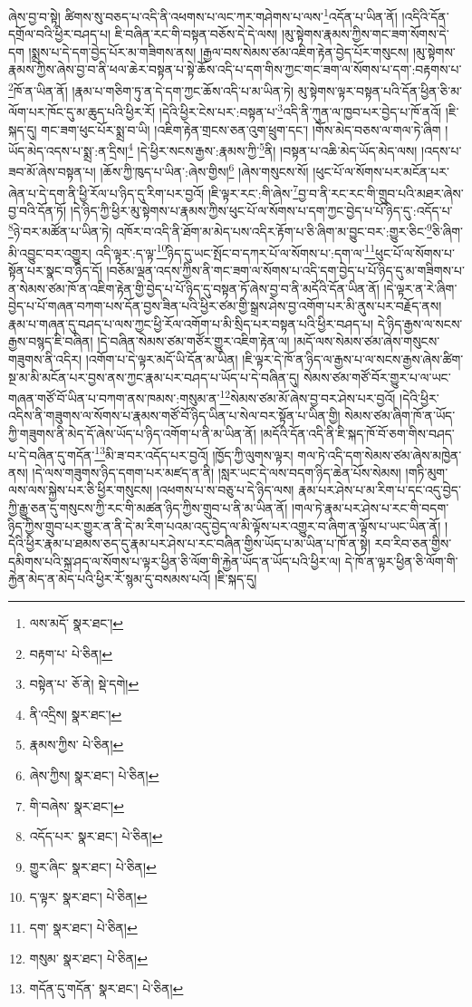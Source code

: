 ཞེས་བྱ་བ་སྟེ། ཚིགས་སུ་བཅད་པ་འདི་ནི་འཕགས་པ་ལང་ཀར་གཤེགས་པ་ལས་\footnote{ལས་མདོ་  སྣར་ཐང་། }འདོན་པ་ཡིན་ནོ། །འདིའི་དོན་དགྲོལ་བའི་ཕྱིར་བཤད་པ། ཇི་བཞིན་རང་གི་བསྟན་བཅོས་དེ་དེ་ལས། །མུ་སྟེགས་རྣམས་ཀྱིས་གང་ཟག་སོགས་དེ་དག །སྨྲས་པ་དེ་དག་བྱེད་པོར་མ་གཟིགས་ནས། །རྒྱལ་བས་སེམས་ཙམ་འཇིག་རྟེན་བྱེད་པོར་གསུངས། །མུ་སྟེགས་རྣམས་ཀྱིས་ཞེས་བྱ་བ་ནི་ཕལ་ཆེར་བསྟན་པ་སྟེ་ཆོས་འདི་པ་དག་གིས་ཀྱང་གང་ཟག་ལ་སོགས་པ་དག་:བརྟགས་པ་\footnote{བརྟག་པ་  པེ་ཅིན། }ཁོ་ན་ཡིན་ནོ། །རྣམ་པ་གཅིག་ཏུ་ན་དེ་དག་ཀྱང་ཆོས་འདི་པ་མ་ཡིན་ཏེ། མུ་སྟེགས་ལྟར་བསྟན་པའི་དོན་ཕྱིན་ཅི་མ་ལོག་པར་ཁོང་དུ་མ་ཆུད་པའི་ཕྱིར་རོ། །དེའི་ཕྱིར་ངེས་པར་:བསྟན་པ་\footnote{བསྟེན་པ་  ཅོ་ནེ།  སྡེ་དགེ། }འདི་ནི་ཀུན་ལ་ཁྱབ་པར་བྱེད་པ་ཁོ་ནའོ། །ཇི་སྐད་དུ། གང་ཟག་ཕུང་པོར་སྨྲ་བ་ཡི། །འཇིག་རྟེན་གྲངས་ཅན་འུག་ཕྲུག་དང་། །གོས་མེད་བཅས་ལ་གལ་ཏེ་ཞིག །ཡོད་མེད་འདས་པ་སྨྲ་:ན་དྲིས།\footnote{ནི་འདྲིས།  སྣར་ཐང་། } །དེ་ཕྱིར་སངས་རྒྱས་:རྣམས་ཀྱི་\footnote{རྣམས་ཀྱིས་  པེ་ཅིན། }ནི། །བསྟན་པ་འཆི་མེད་ཡོད་མེད་ལས། །འདས་པ་ཟབ་མོ་ཞེས་བསྟན་པ། །ཆོས་ཀྱི་ཁུད་པ་ཡིན་:ཞེས་གྱིས།\footnote{ཞེས་ཀྱིས།  སྣར་ཐང་།  པེ་ཅིན། } །ཞེས་གསུངས་སོ། །ཕུང་པོ་ལ་སོགས་པར་མངོན་པར་ཞེན་པ་དེ་དག་ནི་ཕྱི་རོལ་པ་ཉིད་དུ་རིག་པར་བྱའོ། །ཇི་ལྟར་རང་:གི་ཞེས་\footnote{གི་བཞེས་  སྣར་ཐང་། }བྱ་བ་ནི་རང་རང་གི་གྲུབ་པའི་མཐར་ཞེས་བྱ་བའི་དོན་ཏོ། །དེ་ཉིད་ཀྱི་ཕྱིར་མུ་སྟེགས་པ་རྣམས་ཀྱིས་ཕུང་པོ་ལ་སོགས་པ་དག་ཀྱང་བྱེད་པ་པོ་ཉིད་དུ་:འདོད་པ་\footnote{འདོད་པར་  སྣར་ཐང་།  པེ་ཅིན། }ཉེ་བར་མཚོན་པ་ཡིན་ཏེ། འཁོར་བ་འདི་ནི་ཐོག་མ་མེད་པས་འདིར་རྟོག་པ་ཅི་ཞིག་མ་བྱུང་བར་:གྱུར་ཅིང་\footnote{གྱུར་ཞིང་  སྣར་ཐང་།  པེ་ཅིན། }ཅི་ཞིག་མི་འབྱུང་བར་འགྱུར། འདི་ལྟར་:ད་ལྟ་\footnote{ད་ལྟར་  སྣར་ཐང་།  པེ་ཅིན། }ཉིད་དུ་ཡང་སྤོང་བ་དཀར་པོ་ལ་སོགས་པ་:དག་ལ་\footnote{དག་  སྣར་ཐང་།  པེ་ཅིན། }ཕུང་པོ་ལ་སོགས་པ་སྟོན་པར་སྣང་བ་ཉིད་དོ། །བཅོམ་ལྡན་འདས་ཀྱིས་ནི་གང་ཟག་ལ་སོགས་པ་འདི་དག་བྱེད་པ་པོ་ཉིད་དུ་མ་གཟིགས་པ་ན་སེམས་ཙམ་ཁོ་ན་འཇིག་རྟེན་གྱི་བྱེད་པ་པོ་ཉིད་དུ་བསྟན་ཏོ་ཞེས་བྱ་བ་ནི་མདོའི་དོན་ཡིན་ནོ། །དེ་ལྟར་ན་རེ་ཞིག་བྱེད་པ་པོ་གཞན་བཀག་པས་དོན་བྱས་ཟིན་པའི་ཕྱིར་ཙམ་གྱི་སྒྲས་ཤེས་བྱ་འགོག་པར་མི་ནུས་པར་བརྗོད་ནས། རྣམ་པ་གཞན་དུ་བཤད་པ་ལས་ཀྱང་ཕྱི་རོལ་འགོག་པ་མི་སྲིད་པར་བསྟན་པའི་ཕྱིར་བཤད་པ། དེ་ཉིད་རྒྱས་ལ་སངས་རྒྱས་བསྙད་ཇི་བཞིན། །དེ་བཞིན་སེམས་ཙམ་གཙོར་གྱུར་འཇིག་རྟེན་ལ། །མདོ་ལས་སེམས་ཙམ་ཞེས་གསུངས་གཟུགས་ནི་འདིར། །འགོག་པ་དེ་ལྟར་མདོ་ཡི་དོན་མ་ཡིན། །ཇི་ལྟར་དེ་ཁོ་ན་ཉིད་ལ་རྒྱས་པ་ལ་སངས་རྒྱས་ཞེས་ཚིག་སྔ་མ་མི་མངོན་པར་བྱས་ནས་ཀྱང་རྣམ་པར་བཤད་པ་ཡོད་པ་དེ་བཞིན་དུ། སེམས་ཙམ་གཙོ་བོར་གྱུར་པ་ལ་ཡང་གཞན་གཙོ་བོ་ཡིན་པ་བཀག་ནས་ཁམས་:གསུམ་ན་\footnote{གསུམ་  སྣར་ཐང་།  པེ་ཅིན། }སེམས་ཙམ་མོ་ཞེས་བྱ་བར་ཤེས་པར་བྱའོ། །དེའི་ཕྱིར་འདིས་ནི་གཟུགས་ལ་སོགས་པ་རྣམས་གཙོ་བོ་ཉིད་ཡིན་པ་སེལ་བར་སྟོན་པ་ཡིན་གྱི། སེམས་ཙམ་ཞིག་ཁོ་ན་ཡོད་ཀྱི་གཟུགས་ནི་མེད་དོ་ཞེས་ཡོད་པ་ཉིད་འགོག་པ་ནི་མ་ཡིན་ནོ། །མདོའི་དོན་འདི་ནི་ཇི་སྐད་ཁོ་བོ་ཅག་གིས་བཤད་པ་དེ་བཞིན་དུ་གདོན་\footnote{གདོན་དུ་གདོན་  སྣར་ཐང་།  པེ་ཅིན། }མི་ཟ་བར་འདོད་པར་བྱའོ། །ཁྱོད་ཀྱི་ལུགས་ལྟར། གལ་ཏེ་འདི་དག་སེམས་ཙམ་ཞེས་མཁྱེན་ནས། །དེ་ལས་གཟུགས་ཉིད་དགག་པར་མཛད་ན་ནི། །སླར་ཡང་དེ་ལས་བདག་ཉིད་ཆེན་པོས་སེམས། །གཏི་མུག་ལས་ལས་སྐྱེས་པར་ཅི་ཕྱིར་གསུངས། །འཕགས་པ་ས་བཅུ་པ་དེ་ཉིད་ལས། རྣམ་པར་ཤེས་པ་མ་རིག་པ་དང་འདུ་བྱེད་ཀྱི་རྒྱུ་ཅན་དུ་གསུངས་ཀྱི་རང་གི་མཚན་ཉིད་ཀྱིས་གྲུབ་པ་ནི་མ་ཡིན་ནོ། །གལ་ཏེ་རྣམ་པར་ཤེས་པ་རང་གི་བདག་ཉིད་ཀྱིས་གྲུབ་པར་གྱུར་ན་ནི་དེ་མ་རིག་པའམ་འདུ་བྱེད་ལ་མི་ལྟོས་པར་འགྱུར་བ་ཞིག་ན་ལྟོས་པ་ཡང་ཡིན་ནོ། །དེའི་ཕྱིར་རྣམ་པ་ཐམས་ཅད་དུ་རྣམ་པར་ཤེས་པ་རང་བཞིན་གྱིས་ཡོད་པ་མ་ཡིན་པ་ཁོ་ན་སྟེ། རབ་རིབ་ཅན་གྱིས་དམིགས་པའི་སྐྲ་ཤད་ལ་སོགས་པ་ལྟར་ཕྱིན་ཅི་ལོག་གི་རྐྱེན་ཡོད་ན་ཡོད་པའི་ཕྱིར་ལ། དེ་ཁོ་ན་ལྟར་ཕྱིན་ཅི་ལོག་གི་རྐྱེན་མེད་ན་མེད་པའི་ཕྱིར་རོ་སྙམ་དུ་བསམས་པའོ། །ཇི་སྐད་དུ། 
